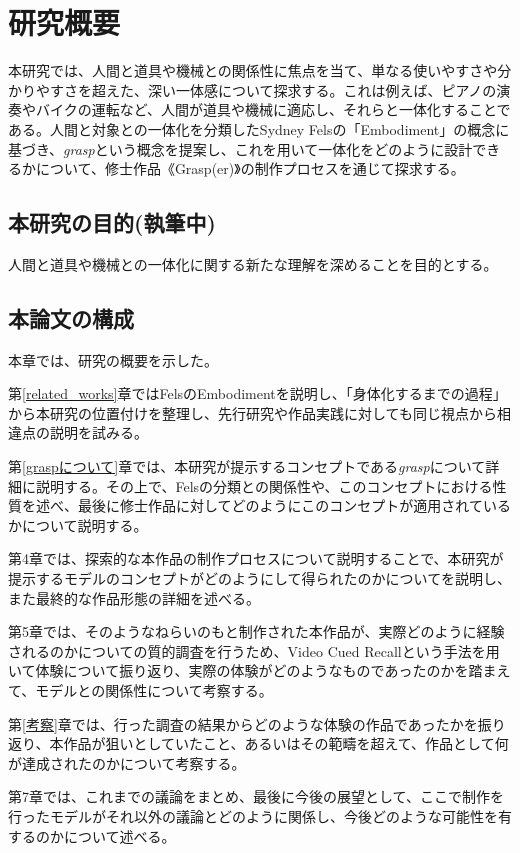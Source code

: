 \chapter{研究概要}
\label{introduction}
本研究では、人間と道具や機械との関係性に焦点を当て、単なる使いやすさや分かりやすさを超えた、深い一体感について探求する。これは例えば、ピアノの演奏やバイクの運転など、人間が道具や機械に適応し、それらと一体化することである。人間と対象との一体化を分類したSydney Felsの「Embodiment」の概念に基づき、\textit{grasp}という概念を提案し、これを用いて一体化をどのように設計できるかについて、修士作品《Grasp(er)》の制作プロセスを通じて探求する。

\section{本研究の目的(執筆中)}
人間と道具や機械との一体化に関する新たな理解を深めることを目的とする。

\section{本論文の構成}
本章では、研究の概要を示した。

第\ref{related_works}章ではFelsのEmbodimentを説明し、「身体化するまでの過程」から本研究の位置付けを整理し、先行研究や作品実践に対しても同じ視点から相違点の説明を試みる。

第\ref{graspについて}章では、本研究が提示するコンセプトである\textit{grasp}について詳細に説明する。その上で、Felsの分類との関係性や、このコンセプトにおける性質を述べ、最後に修士作品に対してどのようにこのコンセプトが適用されているかについて説明する。

第4章では、探索的な本作品の制作プロセスについて説明することで、本研究が提示するモデルのコンセプトがどのようにして得られたのかについてを説明し、また最終的な作品形態の詳細を述べる。

第5章では、そのようなねらいのもと制作された本作品が、実際どのように経験されるのかについての質的調査を行うため、Video Cued Recallという手法を用いて体験について振り返り、実際の体験がどのようなものであったのかを踏まえて、モデルとの関係性について考察する。

第\ref{考察}章では、行った調査の結果からどのような体験の作品であったかを振り返り、本作品が狙いとしていたこと、あるいはその範疇を超えて、作品として何が達成されたのかについて考察する。

第7章では、これまでの議論をまとめ、最後に今後の展望として、ここで制作を行ったモデルがそれ以外の議論とどのように関係し、今後どのような可能性を有するのかについて述べる。